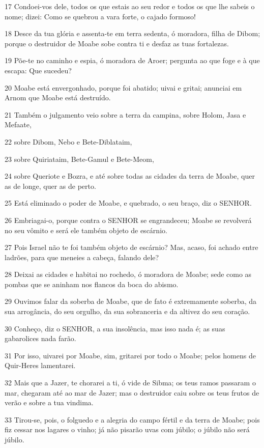 \par 17 Condoei-vos dele, todos os que estais ao seu redor e todos os que lhe sabeis o nome; dizei: Como se quebrou a vara forte, o cajado formoso!
\par 18 Desce da tua glória e assenta-te em terra sedenta, ó moradora, filha de Dibom; porque o destruidor de Moabe sobe contra ti e desfaz as tuas fortalezas.
\par 19 Põe-te no caminho e espia, ó moradora de Aroer; pergunta ao que foge e à que escapa: Que sucedeu?
\par 20 Moabe está envergonhado, porque foi abatido; uivai e gritai; anunciai em Arnom que Moabe está destruído.
\par 21 Também o julgamento veio sobre a terra da campina, sobre Holom, Jasa e Mefaate,
\par 22 sobre Dibom, Nebo e Bete-Diblataim,
\par 23 sobre Quiriataim, Bete-Gamul e Bete-Meom,
\par 24 sobre Queriote e Bozra, e até sobre todas as cidades da terra de Moabe, quer as de longe, quer as de perto.
\par 25 Está eliminado o poder de Moabe, e quebrado, o seu braço, diz o SENHOR.
\par 26 Embriagai-o, porque contra o SENHOR se engrandeceu; Moabe se revolverá no seu vômito e será ele também objeto de escárnio.
\par 27 Pois Israel não te foi também objeto de escárnio? Mas, acaso, foi achado entre ladrões, para que meneies a cabeça, falando dele?
\par 28 Deixai as cidades e habitai no rochedo, ó moradora de Moabe; sede como as pombas que se aninham nos flancos da boca do abismo.
\par 29 Ouvimos falar da soberba de Moabe, que de fato é extremamente soberba, da sua arrogância, do seu orgulho, da sua sobranceria e da altivez do seu coração.
\par 30 Conheço, diz o SENHOR, a sua insolência, mas isso nada é; as suas gabarolices nada farão.
\par 31 Por isso, uivarei por Moabe, sim, gritarei por todo o Moabe; pelos homens de Quir-Heres lamentarei.
\par 32 Mais que a Jazer, te chorarei a ti, ó vide de Sibma; os teus ramos passaram o mar, chegaram até ao mar de Jazer; mas o destruidor caiu sobre os teus frutos de verão e sobre a tua vindima.
\par 33 Tirou-se, pois, o folguedo e a alegria do campo fértil e da terra de Moabe; pois fiz cessar nos lagares o vinho; já não pisarão uvas com júbilo; o júbilo não será júbilo.
